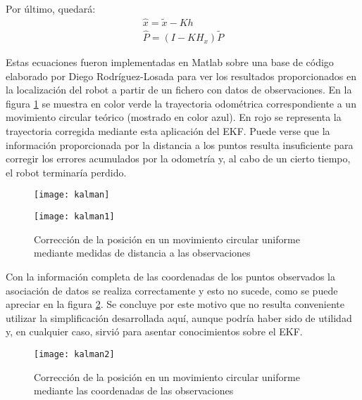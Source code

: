 Por último, quedará:
\begin{eqnarray}
 \hat{x} = \tilde{x} - Kh \label{eq:x1} \\
  \hat{P} = (I-KH_{x})\tilde{P} \label{eq:P1}
\end{eqnarray}

Estas ecuaciones fueron implementadas en Matlab sobre una base de código elaborado por Diego Rodríguez-Losada para ver los resultados proporcionados en la localización del robot a partir de un fichero con datos de observaciones. En la figura \ref{fg:matlab1} se muestra en color verde la trayectoria odométrica correspondiente a un movimiento circular teórico (mostrado en color azul). En rojo se representa la trayectoria corregida mediante esta aplicación del EKF. Puede verse que la información proporcionada por la distancia a los puntos resulta insuficiente para corregir los errores acumulados por la odometría y, al cabo de un cierto tiempo, el robot terminaría perdido.

\begin{figure}[bh]
  \centering\texttt{[image: kalman]}
  
  \vspace{0.5cm}
  
  \centering\texttt{[image: kalman1]}
  \caption{Corrección de la posición en un movimiento circular uniforme mediante medidas de distancia a las observaciones}\label{fg:matlab1}
\end{figure}

Con la información completa de las coordenadas de los puntos observados la asociación de datos se realiza correctamente y esto no sucede, como se puede apreciar en la figura \ref{fg:matlab2}. Se concluye por este motivo que no resulta conveniente utilizar la simplificación desarrollada aquí, aunque podría haber sido de utilidad y, en cualquier caso, sirvió para asentar conocimientos sobre el EKF.

\begin{figure}[h]
  \centering\texttt{[image: kalman2]}\\
  \caption{Corrección de la posición en un movimiento circular uniforme mediante las coordenadas de las observaciones}\label{fg:matlab2}
\end{figure} 